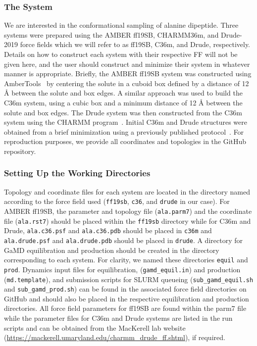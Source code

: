 \documentclass[9pt,tutorial]{livecoms}
\begin{document}
\subsubsection{The System}
We are interested in the conformational sampling of alanine dipeptide. Three systems were prepared using the AMBER ff19SB, CHARMM36m, and Drude-2019 force fields which we will refer to as ff19SB, C36m, and Drude, respectively. Details on how to construct each system with their respective FF will not be given here, and the user should construct and minimize their system in whatever manner is appropriate. Briefly, the AMBER ff19SB system was constructed using AmberTools~\cite{case_ambertools_2023} by centering the solute in a cuboid box defined by a distance of 12 {\AA} between the solute and box edges. A similar approach was used to build the C36m system, using a cubic box and a minimum distance of 12 {\AA} between the solute and box edges. The Drude system was then constructed from the C36m system using the CHARMM program~\cite{hwang_charmm_2024}. Initial C36m and Drude structures were obtained from a brief minimization using a previously published protocol~\cite{lemkul_preparing_2021}. For reproduction purposes, we provide all coordinates and topologies in the GitHub repository.

\subsubsection{Setting Up the Working Directories} 
Topology and coordinate files for each system are located in the directory named according to the force field used (\texttt{ff19sb}, \texttt{c36}, and \texttt{drude} in our case). For AMBER ff19SB, the parameter and topology file (\texttt{ala.parm7}) and the coordinate file (\texttt{ala.rst7}) should be placed within the \texttt{ff19sb} directory while for C36m and Drude, \texttt{ala.c36.psf} and \texttt{ala.c36.pdb} should be placed in \texttt{c36m} and \texttt{ala.drude.psf} and \texttt{ala.drude.pdb} should be placed in \texttt{drude}. A directory for GaMD equilibration and production should be created in the directory corresponding to each system. For clarity, we named these directories \texttt{equil} and \texttt{prod}. Dynamics input files for equilibration, (\texttt{gamd\_equil.in}) and production (\texttt{md.template}), and submission scripts for SLURM queueing (\texttt{sub\_gamd\_equil.sh} and \texttt{sub\_gamd\_prod.sh}) can be found in the associated force field directories on GitHub and should also be placed in the respective equilibration and production directories. All force field parameters for ff19SB are found within the parm7 file while the parameter files for C36m and Drude systems are listed in the run scripts and can be obtained from the MacKerell lab website (\url{https://mackerell.umaryland.edu/charmm_drude_ff.shtml}), if required. 
\end{document}

